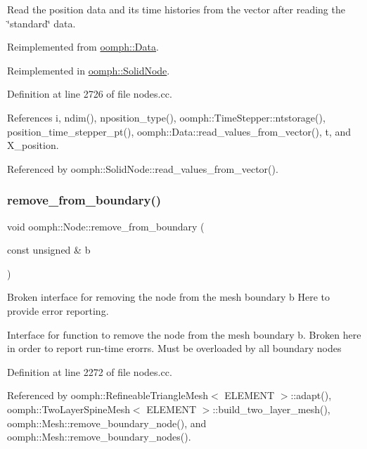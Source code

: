 Read the position data and its time histories from the vector after reading the \char`\"{}standard\char`\"{} data. 

Reimplemented from \hyperlink{classoomph_1_1Data_a6b8bc02debd1bce8e1bfc68cd9a54695}{oomph\+::\+Data}.



Reimplemented in \hyperlink{classoomph_1_1SolidNode_a8884dfe9e2808883e90c7f2822151784}{oomph\+::\+Solid\+Node}.



Definition at line 2726 of file nodes.\+cc.



References i, ndim(), nposition\+\_\+type(), oomph\+::\+Time\+Stepper\+::ntstorage(), position\+\_\+time\+\_\+stepper\+\_\+pt(), oomph\+::\+Data\+::read\+\_\+values\+\_\+from\+\_\+vector(), t, and X\+\_\+position.



Referenced by oomph\+::\+Solid\+Node\+::read\+\_\+values\+\_\+from\+\_\+vector().

\mbox{\label{classoomph_1_1Node_a68d4703f8c8aa9f504ec2111dc1908f4}} 
\subsubsection{\texorpdfstring{remove\+\_\+from\+\_\+boundary()}{remove\_from\_boundary()}}
{\footnotesize\ttfamily void oomph\+::\+Node\+::remove\+\_\+from\+\_\+boundary (\begin{DoxyParamCaption}\item[{const unsigned \&}]{b }\end{DoxyParamCaption})\hspace{0.3cm}{\ttfamily [virtual]}}



Broken interface for removing the node from the mesh boundary b Here to provide error reporting. 

Interface for function to remove the node from the mesh boundary b. Broken here in order to report run-\/time erorrs. Must be overloaded by all boundary nodes 

Definition at line 2272 of file nodes.\+cc.



Referenced by oomph\+::\+Refineable\+Triangle\+Mesh$<$ E\+L\+E\+M\+E\+N\+T $>$\+::adapt(), oomph\+::\+Two\+Layer\+Spine\+Mesh$<$ E\+L\+E\+M\+E\+N\+T $>$\+::build\+\_\+two\+\_\+layer\+\_\+mesh(), oomph\+::\+Mesh\+::remove\+\_\+boundary\+\_\+node(), and oomph\+::\+Mesh\+::remove\+\_\+boundary\+\_\+nodes().


